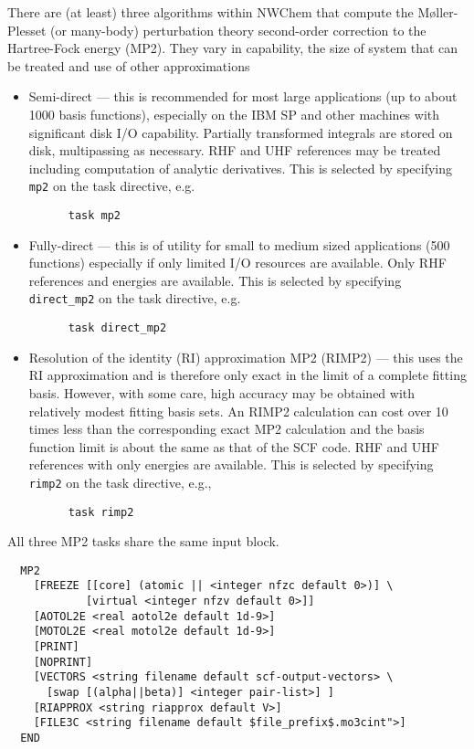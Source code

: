 \label{sec:mp2}
\label{sec:rimp2}

There are (at least) three algorithms within NWChem that compute the
M{\o}ller-Plesset (or many-body) perturbation theory second-order
correction to the Hartree-Fock energy (MP2).  They vary in capability,
the size of system that can be treated and use of other approximations
\begin{itemize}
\item Semi-direct --- this is recommended for most large applications
  (up to about 1000 basis functions), especially on the IBM SP and
  other machines with significant disk I/O capability.  Partially
  transformed integrals are stored on disk, multipassing as necessary.
  RHF and UHF references may be treated including computation of
  analytic derivatives.  This is selected by specifying \verb+mp2+ on
  the task directive, e.g.
\begin{verbatim}
      task mp2
\end{verbatim}
\item Fully-direct --- this is of utility for small to medium sized
  applications (500 functions) especially if only limited I/O
  resources are available.  Only RHF references and energies are
  available. This is selected by specifying \verb+direct_mp2+ on the
  task directive, e.g.
\begin{verbatim}
      task direct_mp2
\end{verbatim}
\item Resolution of the identity (RI) approximation MP2 (RIMP2) ---
  this uses the RI approximation and is therefore only exact in the
  limit of a complete fitting basis.  However, with some care, high
  accuracy may be obtained with relatively modest fitting basis sets.
  An RIMP2 calculation can cost over 10 times less than the
  corresponding exact MP2 calculation and the basis function limit is
  about the same as that of the SCF code.  RHF and UHF references with
  only energies are available.  This is selected by specifying
  \verb+rimp2+ on the task directive, e.g.,
\begin{verbatim}
      task rimp2
\end{verbatim}
\end{itemize}

All three MP2 tasks share the same input block.

\begin{verbatim}
  MP2
    [FREEZE [[core] (atomic || <integer nfzc default 0>)] \
            [virtual <integer nfzv default 0>]]
    [AOTOL2E <real aotol2e default 1d-9>]
    [MOTOL2E <real motol2e default 1d-9>]
    [PRINT]
    [NOPRINT]
    [VECTORS <string filename default scf-output-vectors> \
      [swap [(alpha||beta)] <integer pair-list>] ]
    [RIAPPROX <string riapprox default V>]
    [FILE3C <string filename default $file_prefix$.mo3cint">]
  END
\end{verbatim}

